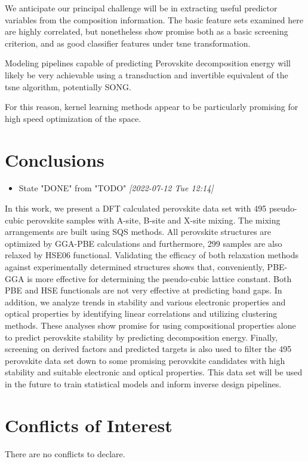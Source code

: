 \documentclass[twoside, twocolumn, 9pt, draft]{article}
\begin{document}
We anticipate our principal challenge will be in extracting useful
predictor variables from the composition information. The basic
feature sets examined here are highly correlated, but nonetheless show
promise both as a basic screening criterion, and as good classifier
features under \gls{tsne} transformation.

Modeling pipelines capable of predicting Perovskite decomposition
energy will likely be very achievable using a transduction and
invertible equivalent of the \gls{tsne} algorithm,
potentially SONG.

For this reason, kernel learning methods appear to be particularly
promising for high speed optimization of the space.

\section*{Conclusions}
\label{sec:org29cf3b4}
\begin{itemize}
\item State "DONE"       from "TODO"       \textit{[2022-07-12 Tue 12:14]}
\end{itemize}
In this work, we present a DFT calculated perovskite data set with 495
pseudo-cubic perovskite samples with A-site, B-site and X-site
mixing. The mixing arrangements are built using SQS methods. All
perovskite structures are optimized by GGA-PBE calculations and
furthermore, 299 samples are also relaxed by HSE06
functional. Validating the efficacy of both relaxation methods against
experimentally determined structures shows that, conveniently, PBE-GGA
is more effective for determining the pseudo-cubic lattice
constant. Both PBE and HSE functionals are not very effective at
predicting band gaps. In addition, we analyze trends in stability and
various electronic properties and optical properties by identifying
linear correlations and utilizing clustering methods. These analyses
show promise for using compositional properties alone to predict
perovskite stability by predicting decomposition energy. Finally,
screening on derived factors and predicted targets is also used to
filter the 495 perovskite data set down to some promising perovskite
candidates with high stability and suitable electronic and optical
properties. This data set will be used in the future to train
statistical models and inform inverse design pipelines.

\section*{Conflicts of Interest}
\label{sec:org5116adb}
There are no conflicts to declare.
\end{document}
